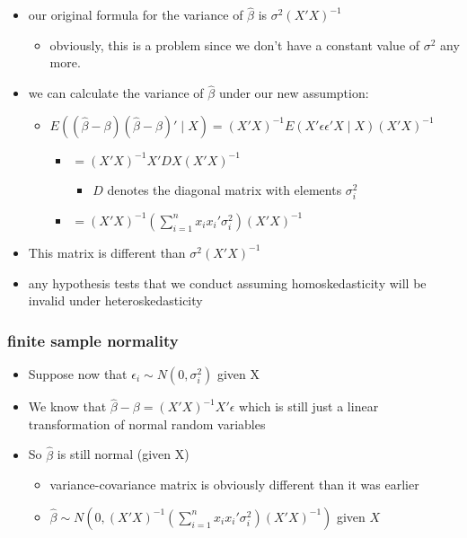 \documentclass[11pt]{article}
\begin{document}
\begin{itemize}
\item our original formula for the variance of $\hat\beta$ is
        $\sigma^2 (X'X)^{-1}$
\begin{itemize}
\item obviously, this is a problem since we don't have a constant
          value of $\sigma^2$ any more.
\end{itemize}
\item we can calculate the variance of $\hat\beta$ under our new
        assumption:
\begin{itemize}
\item $E((\hat\beta - \beta)(\hat\beta - \beta)' \mid X) =
          (X'X)^{-1} E(X'\epsilon \epsilon'X \mid X) (X'X)^{-1}$
\begin{itemize}
\item $= (X'X)^{-1} X'DX (X'X)^{-1}$
\begin{itemize}
\item $D$ denotes the diagonal matrix with elements $\sigma_i^2$
\end{itemize}
\item $= (X'X)^{-1} (\sum_{i=1}^n x_i x_i' \sigma_i^2)(X'X)^{-1}$
\end{itemize}
\end{itemize}
\item This matrix is different than $\sigma^2(X'X)^{-1}$
\item any hypothesis tests that we conduct assuming homoskedasticity
        will be invalid under heteroskedasticity
\end{itemize}
\subsubsection{finite sample normality}
\label{sec-1-1-5}

\begin{itemize}
\item Suppose now that $\epsilon_i \sim N(0, \sigma_i^2)$ given X
\item We know that $\hat\beta - \beta = (X'X)^{-1}X'\epsilon$ which
        is still just a linear transformation of normal random variables
\item So $\hat\beta$ is still normal (given X)
\begin{itemize}
\item variance-covariance matrix is obviously different than it was
          earlier
\item $\hat \beta \sim N\left(0, (X'X)^{-1} \left(\sum_{i=1}^n x_i x_i' \sigma_i^2 \right)
          (X'X)^{-1}\right)$ given $X$
\end{itemize}
\end{itemize}
\end{document}
